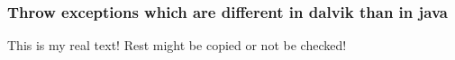 \subsubsection{Throw exceptions which are different in dalvik than in java} \label{subsubsection:evaluation-reengineering-break-exception}
This is my real text! Rest might be copied or not be checked!

